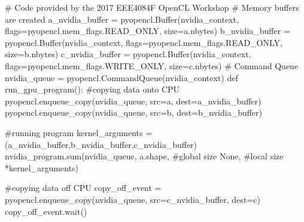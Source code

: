 \begin{OpenCL}
# Code provided by the 2017 EEE4084F OpenCL Workshop
# Memory buffers are created
a_nvidia_buffer = pyopencl.Buffer(nvidia_context,
                                 flags=pyopencl.mem_flags.READ_ONLY, 
                                 size=a.nbytes)
b_nvidia_buffer = pyopencl.Buffer(nvidia_context, 
                                 flags=pyopencl.mem_flags.READ_ONLY, 
                                 size=b.nbytes)
c_nvidia_buffer = pyopencl.Buffer(nvidia_context, 
                                 flags=pyopencl.mem_flags.WRITE_ONLY, 
                                 size=c.nbytes)
# Command Queue
nvidia_queue = pyopencl.CommandQueue(nvidia_context)
def run_gpu_program():
    #copying data onto CPU
    pyopencl.enqueue_copy(nvidia_queue,
                          src=a,
                          dest=a_nvidia_buffer)
    pyopencl.enqueue_copy(nvidia_queue,
                          src=b,
                          dest=b_nvidia_buffer)
    
    #running program
    kernel_arguments = (a_nvidia_buffer,b_nvidia_buffer,c_nvidia_buffer) 
    nvidia_program.sum(nvidia_queue,
                       a.shape, #global size
                       None, #local size
                       *kernel_arguments)

    #copying data off CPU
    copy_off_event = pyopencl.enqueue_copy(nvidia_queue,
                                           src=c_nvidia_buffer,
                                           dest=c)
    copy_off_event.wait()
\end{OpenCL}